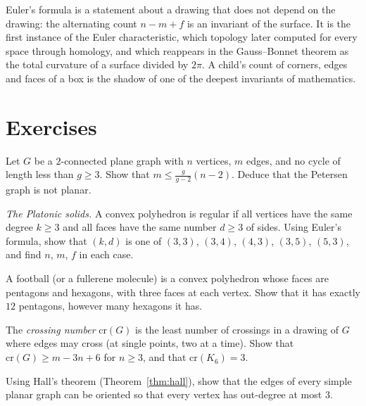 \begin{beauty}
Euler's formula is a statement about a drawing that does not depend on the drawing: the alternating count $n-m+f$ is an invariant of the
surface. It is the first instance of the Euler characteristic, which topology later computed for every space through homology, and which
reappears in the Gauss--Bonnet theorem as the total curvature of a surface divided by $2\pi$. A child's count of corners, edges and faces of a box
is the shadow of one of the deepest invariants of mathematics.
\end{beauty}

\section{Exercises}

\begin{exercise}[$\star$]\label{ex:girth}
Let $G$ be a $2$-connected plane graph with $n$ vertices, $m$ edges, and no cycle of length less than $g\ge3$. Show that $m\le\frac g{g-2}(n-2)$. Deduce that the
Petersen graph is not planar.
\end{exercise}

\begin{exercise}[$\star\star$]\label{ex:platonic}
\emph{The Platonic solids.} A convex polyhedron is regular if all vertices have the same degree $k\ge3$ and all faces have the same number $d\ge3$ of sides. Using
Euler's formula, show that $(k,d)$ is one of $(3,3)$, $(3,4)$, $(4,3)$, $(3,5)$, $(5,3)$, and find $n$, $m$, $f$ in each case.
\end{exercise}

\begin{exercise}[$\star$]\label{ex:football}
A football (or a fullerene molecule) is a convex polyhedron whose faces are pentagons and hexagons, with three faces at each vertex. Show that it has
exactly $12$ pentagons, however many hexagons it has.
\end{exercise}

\begin{exercise}[$\star\star$]\label{ex:crossing}
The \emph{crossing number} $\mathrm{cr}(G)$ is the least number of crossings in a drawing of $G$ where edges may cross (at single points, two at a time). Show that
$\mathrm{cr}(G)\ge m-3n+6$ for $n\ge3$, and that $\mathrm{cr}(K_6)=3$.
\end{exercise}

\begin{exercise}[$\star\star$]\label{ex:hakimi}
Using Hall's theorem (Theorem~\ref{thm:hall}), show that the edges of every simple planar graph can be oriented so that every vertex has out-degree at most $3$.
\end{exercise}

